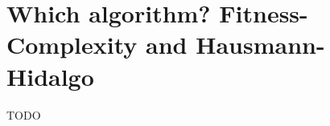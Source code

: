 \section{Which algorithm? Fitness-Complexity and Hausmann-Hidalgo}
\label{sec:appendix-algorithm}

TODO
